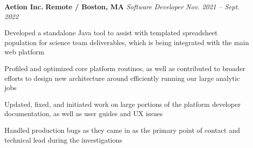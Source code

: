 \item
\headerrow
{\textbf{Aetion Inc.}}
{\textbf{Remote / Boston, MA}}
\headerrow
{\emph{Software Developer}}
{\emph{Nov. 2021 -- Sept. 2022}}
\begin{itemize*}
    \item Developed a standalone Java tool to assist with templated spreadsheet
        population for science team deliverables, which is being integrated
        with the main web platform
    \item Profiled and optimized core platform routines, as well as contributed
        to broader efforts to design new architecture around efficiently
        running our large analytic jobs
    \item Updated, fixed, and initiated work on large portions of the platform
        developer documentation, as well as user guides and UX issues
    \item Handled production bugs as they came in as the primary point of contact
        and technical lead during the investigations
\end{itemize*}
